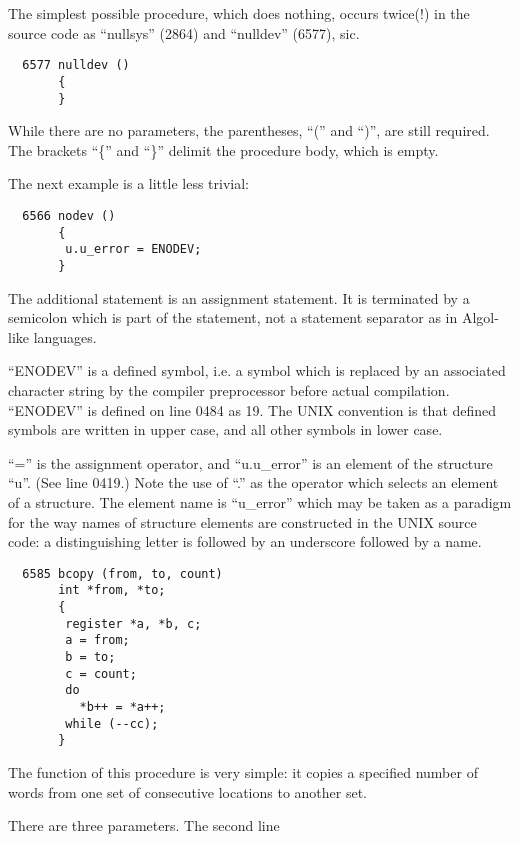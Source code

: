 
The simplest possible procedure, which
does nothing, occurs twice(!) in the
source code as ``nullsys'' (2864) and
``nulldev'' (6577), sic.

\newpage
\begin{verbatim}
  6577 nulldev ()
       {
       }
\end{verbatim}

While there are no parameters, the
parentheses, ``('' and ``)'', are still
required. The brackets ``\{'' and ``\}''
delimit the procedure body, which is
empty.


The next example is a little less
trivial:

\begin{verbatim}
  6566 nodev ()
       {
        u.u_error = ENODEV;
       }
\end{verbatim}


The additional statement is an assignment
statement. It is terminated by a
semicolon which is part of the statement,
not a statement separator as in
Algol-like languages.

``ENODEV'' is a defined symbol, i.e. a
symbol which is replaced by an associated
character string by the compiler
preprocessor before actual compilation.
``ENODEV'' is defined on line 0484 as 19.
The UNIX convention is that defined
symbols are written in upper case, and
all other symbols in lower case.

``='' is the assignment operator, and
``u.u\_error'' is an element of the structure
``u''. (See line 0419.) Note the use
of ``.'' as the operator which selects an
element of a structure. The element
name is ``u\_error'' which may be taken as
a paradigm for the way names of structure
elements are constructed in the
UNIX source code: a distinguishing
letter is followed by an underscore
followed by a name.


\begin{verbatim}
  6585 bcopy (from, to, count)
       int *from, *to;
       {
        register *a, *b, c;
        a = from;
        b = to;
        c = count;
        do
          *b++ = *a++;
        while (--cc);
       }
\end{verbatim}

The function of this procedure is very
simple: it copies a specified number of
words from one set of consecutive
locations to another set.

There are three parameters. The second
line

